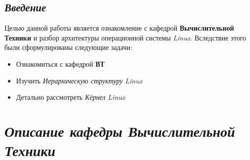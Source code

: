 \documentclass[12pt,a4paper]{article}
\begin{document}
\begin{flushleft}

\begin{center}
\section*{\textit{Введение}}
\end{center}
Целью данной работы является ознакомление с кафедрой \textbf{Вычислительной Техники} и разбор архитектуры операционной системы \textit{Linux}. Вследствие этого были сформулированы следующие задачи:
\begin{itemize}
\item Ознакомиться с кафедрой \textbf{ВТ}
\item Изучить \textit{Иерархическую структуру \textit{Linux}}
\item Детально рассмотреть \textit{Кёрнел Linux}
\end{itemize}
\newpage
\tableofcontents
\newpage
\section{\textit{Описание кафедры Вычислительной Техники}}

\end{flushleft}
\end{document}
